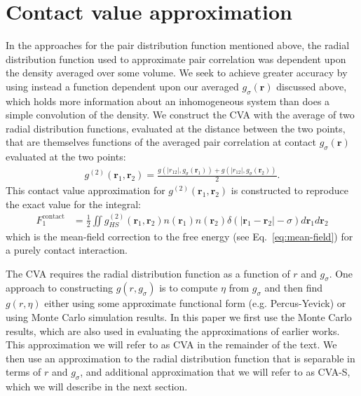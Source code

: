 \documentclass[letterpaper,twocolumn,amsmath,amssymb,pre,aps,10pt]{revtex4-1}
\newcommand{\rr}{\textbf{r}}
\begin{document}
\section{Contact value approximation}
In the approaches for the pair distribution function mentioned above,
the radial distribution function used to approximate pair correlation
was dependent upon the density averaged over some volume.  We seek to
achieve greater accuracy by using instead a function dependent upon
our averaged $g_{\sigma}(\rr)$ discussed above, which holds more
information about an inhomogeneous system than does a simple
convolution of the density.
%
We construct the CVA with the average of two radial distribution
functions, evaluated at the distance between the two points, that are
themselves functions of the averaged pair correlation at contact
$g_{\sigma}(\rr)$ evaluated at the two points:
%
\begin{align}
  g^{(2)}(\rr_1,\rr_2) = \frac{g(|r_{12}|, g_\sigma(\rr_1)) +
    g(|r_{12}|, g_\sigma(\rr_2))}{2}. \label{eq:g2-our-mean}
\end{align}
This contact value approximation for $g^{(2)}(\rr_1,\rr_2)$ is
constructed to reproduce the exact value for the integral:
\begin{align}
  F_1^{\text{contact}} &= \tfrac12 \iint
  g^{(2)}_{HS}(\rr_1,\rr_2)n(\rr_1)n(\rr_2)\delta(|\rr_1-\rr_2|-\sigma)
  d\rr_1d\rr_2
  \label{eq:mean-field-contact}
\end{align}
which is the mean-field correction to the free energy (see
Eq.~\ref{eq:mean-field}) for a purely contact interaction.

The CVA requires the radial distribution function as a function of $r$
and $g_\sigma$.  One approach to constructing $g(r,g_\sigma)$ is to
compute $\eta$ from $g_\sigma$ and then find $g(r,\eta)$ either using
some approximate functional form (e.g. Percus-Yevick) or using Monte
Carlo simulation results.  In this paper we first use the Monte Carlo
results, which are also used in evaluating the approximations of
earlier works.  This approximation we will refer to as CVA in the
remainder of the text.  We then use an approximation to the radial
distribution function that is separable in terms of $r$ and
$g_\sigma$, and additional approximation that we will refer to as
CVA-S, which we will describe in the next section.
\end{document}
